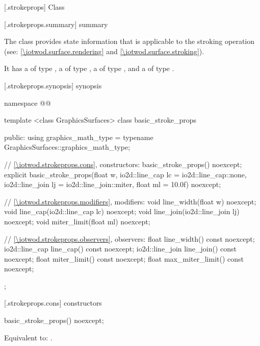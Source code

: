 
 [\iotwod.strokeprops] {Class }

 [\iotwod.strokeprops.summary] { summary}

\pnum
The  class provides state information that is applicable to the stroking operation (see: \ref{\iotwod.surface.rendering} and \ref{\iotwod.surface.stroking}).

\pnum
It has a  of type , a  of type , a  of type , and a  of type .

 [\iotwod.strokeprops.synopsis] { synopsis}

\begin{codeblock}
namespace @\fullnamespace{}@ {
  template <class GraphicsSurfaces>
  class basic_stroke_props {
  public:
	using graphics_math_type = typename GraphicsSurfaces::graphics_math_type;

    // \ref{\iotwod.strokeprops.cons}, constructors:
    basic_stroke_props() noexcept;
    explicit basic_stroke_props(float w, io2d::line_cap lc = io2d::line_cap::none,
      io2d::line_join lj = io2d::line_join::miter, float ml = 10.0f) noexcept;

    // \ref{\iotwod.strokeprops.modifiers}, modifiers:
    void line_width(float w) noexcept;
    void line_cap(io2d::line_cap lc) noexcept;
    void line_join(io2d::line_join lj) noexcept;
    void miter_limit(float ml) noexcept;

    // \ref{\iotwod.strokeprops.observers}, observers:
    float line_width() const noexcept;
    io2d::line_cap line_cap() const noexcept;
    io2d::line_join line_join() const noexcept;
    float miter_limit() const noexcept;
    float max_miter_limit() const noexcept;
  };
}
\end{codeblock}

 [\iotwod.strokeprops.cons] { constructors}

%
\begin{itemdecl}
basic_stroke_props() noexcept;
\end{itemdecl}
\begin{itemdescr}
\pnum
\effects
Equivalent to: .
\end{itemdescr}

